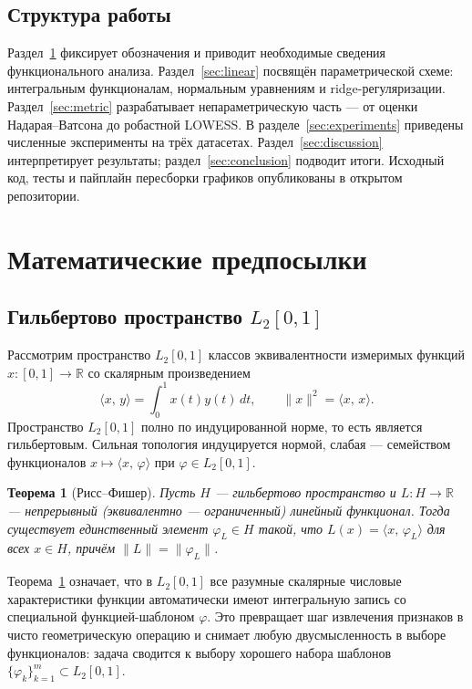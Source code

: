 \documentclass[12pt,a4paper]{article}
\newtheorem{theorem}{Теорема}
\theoremstyle{definition}
\theoremstyle{remark}
\newcommand{\R}{\mathbb{R}}
\newcommand{\Ltwo}{L_{2}[0,1]}
\newcommand{\inner}[2]{\langle #1,\,#2\rangle}
\newcommand{\norm}[1]{\lVert#1\rVert}
\begin{document}
\subsection{Структура работы}

Раздел~\ref{sec:prelim} фиксирует обозначения и приводит необходимые
сведения функционального анализа. Раздел~\ref{sec:linear} посвящён
параметрической схеме: интегральным функционалам, нормальным уравнениям и
ridge-регуляризации. Раздел~\ref{sec:metric} разрабатывает непараметрическую
часть --- от оценки Надарая--Ватсона до робастной LOWESS. В
разделе~\ref{sec:experiments} приведены численные эксперименты на трёх
датасетах. Раздел~\ref{sec:discussion} интерпретирует результаты;
раздел~\ref{sec:conclusion} подводит итоги. Исходный код, тесты и пайплайн
пересборки графиков опубликованы в открытом репозитории.

\section{Математические предпосылки}
\label{sec:prelim}

\subsection{Гильбертово пространство $\Ltwo$}

Рассмотрим пространство $\Ltwo$ классов эквивалентности измеримых функций
$x\colon[0,1]\to\R$ со скалярным произведением
\[
    \inner{x}{y}=\int_{0}^{1}x(t)y(t)\,dt,\qquad
    \norm{x}^{2}=\inner{x}{x}.
\]
Пространство $\Ltwo$ полно по индуцированной норме, то есть является
гильбертовым. Сильная топология индуцируется нормой, слабая --- семейством
функционалов $x\mapsto\inner{x}{\varphi}$ при $\varphi\in\Ltwo$.

\begin{theorem}[Рисс--Фишер]\label{thm:riesz}
Пусть $H$ --- гильбертово пространство и $L\colon H\to\R$ --- непрерывный
(эквивалентно --- ограниченный) линейный функционал. Тогда существует
единственный элемент $\varphi_{L}\in H$ такой, что
$L(x)=\inner{x}{\varphi_{L}}$ для всех $x\in H$, причём
$\norm{L}=\norm{\varphi_{L}}$.
\end{theorem}

\noindent Теорема~\ref{thm:riesz} означает, что в $\Ltwo$ все разумные
скалярные числовые характеристики функции автоматически имеют интегральную
запись со специальной функцией-шаблоном $\varphi$. Это превращает шаг
извлечения признаков в чисто геометрическую операцию и снимает любую
двусмысленность в выборе функционалов: задача сводится к выбору хорошего
набора шаблонов $\{\varphi_{k}\}_{k=1}^{m}\subset\Ltwo$.
\end{document}
